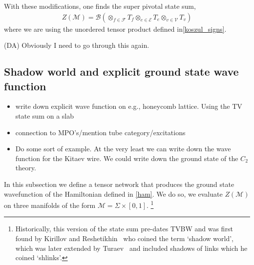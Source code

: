 \documentclass[12pt,a4paper]{article}
\newcommand{\tp}{\otimes}
\newcommand{\mce}{\mathcal{E}}
\newcommand{\mcb}{\mathcal{B}}
\newcommand{\mcm}{\mathcal{M}}
\newcommand{\mcv}{\mathcal{V}}
\newcommand{\mcf}{\mathcal{F}}
\newcommand{\dave}[1]{{\color{ao(english)}\footnotesize{(DA) #1}}}
\begin{document}
With these modifications, one finds the super pivotal state sum, 
\begin{align}
Z(\mcm) = \mcb( \tp_{f \in \mcf} T_f \tp_{e \in \mce} T_e \tp_{v \in \mcv} T_v)
\end{align}
where we are using the unordered tensor product defined in\ref{koszul_signs}. 

\dave{Obviously I need to go through this again}. 

\subsection{Shadow world and explicit ground state wave function}

\begin{itemize} 
\item write down explicit wave function on e.g., honeycomb lattice. Using the TV state sum on a slab
\item connection to MPO's/mention tube category/excitations
\item Do some sort of example. At the very least we can write down the wave function for the Kitaev wire.
We could write down the ground state of the $C_2$ theory.
\end{itemize} 

In this subsection we define a tensor network that produces the ground state wavefunction of the Hamiltonian defined in \eqref{ham}.
We do so, we evaluate $Z(\mcm)$ on three manifolds of the form $\mcm =\Sigma \times [0,1]$.
\footnote{Historically, this version of the state sum pre-dates TVBW and was first found by Kirillov and Reshetikhin~\cite{Kirillow1989} who coined the term `shadow world', which was later extended by Turaev~\cite{turaev1992shadow} and included shadows of links which he coined `shlinks'.}
\end{document}
